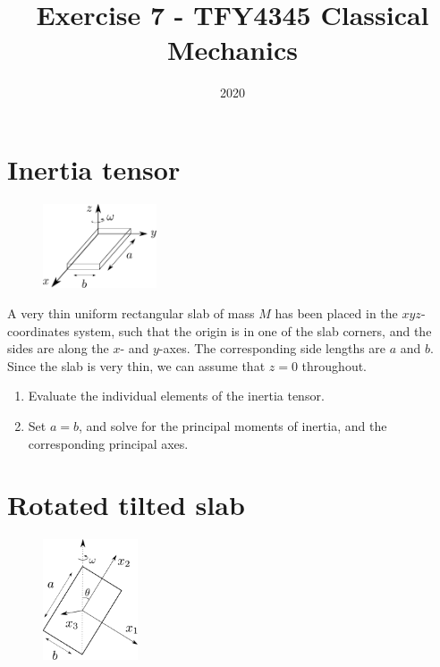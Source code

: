 \documentclass{article}
\title{Exercise 7 - TFY4345 Classical Mechanics}
\date{2020}
\begin{document}
    \maketitle
    \section{Inertia tensor}
    \begin{figure}
        \includegraphics[width=0.3\textwidth]{figures/exercise_7_1_slab.pdf}
        \vspace{-2cm}
    \end{figure}
    A very thin uniform rectangular slab of mass $M$ has been placed in the $xyz$-coordinates system, such that the origin is in one of the slab corners, and the sides are along the $x$- and $y$-axes. The corresponding side lengths are $a$ and $b$. Since the slab is very thin, we can assume that $z=0$ throughout.
    \begin{enumerate}[label=(\alph*)]
        \item Evaluate the individual elements of the inertia tensor.
        \item Set $a = b$, and solve for the principal moments of inertia, and the corresponding principal axes.
    \end{enumerate}

    \section{Rotated tilted slab}
        \begin{figure}
            \includegraphics[width=0.25\textwidth]{figures/exercise_7_2_slab.pdf}
        \end{figure}
\end{document}
